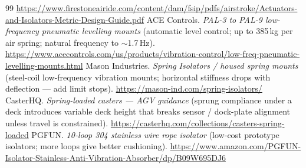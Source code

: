 \documentclass[11pt,a4paper]{article}
\begin{document}
\begin{thebibliography}{99}
\url{https://www.firestoneairide.com/content/dam/fsip/pdfs/airstroke/Actuators-and-Isolators-Metric-Design-Guide.pdf}
 ACE Controls. \textit{PAL-3 to PAL-9 low-frequency pneumatic levelling mounts}
(automatic level control; up to 385\,kg per air spring; natural frequency to $\sim$1.7\,Hz).
\url{https://www.acecontrols.com/us/products/vibration-control/low-freq-pneumatic-levelling-mounts.html}
 Mason Industries. \textit{Spring Isolators / housed spring mounts} (steel-coil low-frequency
vibration mounts; horizontal stiffness drops with deflection --- add limit stops).
\url{https://mason-ind.com/spring-isolators/}
 CasterHQ. \textit{Spring-loaded casters --- AGV guidance} (sprung compliance under a
deck introduces variable deck height that breaks sensor / dock-plate alignment unless travel is constrained).
\url{https://casterhq.com/collections/casters-spring-loaded}
 PGFUN. \textit{10-loop 304 stainless wire rope isolator} (low-cost prototype isolators;
more loops give better cushioning).
\url{https://www.amazon.com/PGFUN-Isolator-Stainless-Anti-Vibration-Absorber/dp/B09W695DJ6}
\end{thebibliography}
\end{document}
